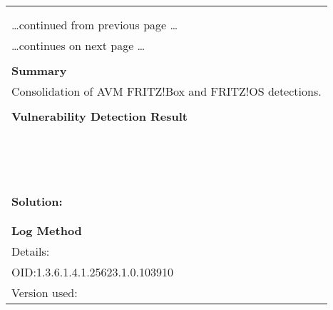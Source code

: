 \documentclass{article}
\begin{document}
\begin{longtable}{|p{}|}
\hline
\rowcolor{gvm_log}{\color{white}{Log (CVSS: 0.0) }}\\
\rowcolor{gvm_log}{\color{white}{NVT: AVM FRITZ!Box / FRITZ!OS Detection Consolidation}}\\
\hline
\endfirsthead
\hfill\ldots continued from previous page \ldots \\
\hline
\endhead
\hline
\ldots continues on next page \ldots \\
\endfoot
\hline
\endlastfoot
\\
\textbf{Summary}\\
Consolidation of AVM FRITZ!Box and FRITZ!OS detections.\\

        \hline
        \\
\textbf{Vulnerability Detection Result}\\
\rowcolor{white}{\verb=Detected AVM FRITZ!OS=}\\
\rowcolor{white}{\verb=Version:       unknown=}\\
\rowcolor{white}{\verb=Location:      /=}\\
\rowcolor{white}{\verb=CPE:           cpe:/o:avm:fritz%21_os=}\\
\rowcolor{white}{\verb=Detected AVM FRITZ!Box 7490=}\\
\rowcolor{white}{\verb=Location:      /=}\\
\rowcolor{white}{\verb=CPE:           cpe:/h:avm:fritzbox:7490=}\\
\rowcolor{white}{\verb=Exposed services:=}\\
\rowcolor{white}{\verb=HTTP(s) on port 80/tcp=}\\
\rowcolor{white}{\verb=HTTP(s) on port 443/tcp=}\\
\rowcolor{white}{\verb=SIP on port 5060/tcp=}\\
\rowcolor{white}{\verb=Banner: FRITZ!OS=}\\
\rowcolor{white}{\verb=FTP on port 21/ftp=}\\
\rowcolor{white}{\verb=Banner: 220 FRITZ!Box7490 FTP server ready.=}\\

          \hline
          \\
\textbf{Solution:}\\
\\


        \hline
        \\
\textbf{Log Method}\\
Details:
\rowcolor{white}{\verb=AVM FRITZ!Box / FRITZ!OS Detection Consolidation=}\\
OID:1.3.6.1.4.1.25623.1.0.103910\\
Version used:
\rowcolor{white}{\verb=2022-03-28T10:48:38Z=}\\
\end{longtable}
\end{document}
